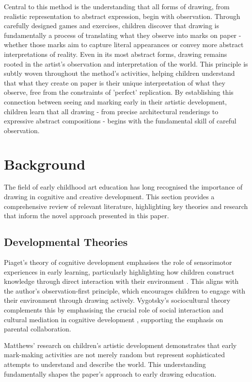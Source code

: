 \documentclass{article}
\begin{document}
Central to this method is the understanding that all forms of drawing, from realistic representation to abstract expression, begin with observation. Through carefully designed games and exercises, children discover that drawing is fundamentally a process of translating what they observe into marks on paper - whether those marks aim to capture literal appearances or convey more abstract interpretations of reality. Even in its most abstract forms, drawing remains rooted in the artist's observation and interpretation of the world. This principle is subtly woven throughout the method's activities, helping children understand that what they create on paper is their unique interpretation of what they observe, free from the constraints of 'perfect' replication. By establishing this connection between seeing and marking early in their artistic development, children learn that all drawing - from precise architectural renderings to expressive abstract compositions - begins with the fundamental skill of careful observation.

\section{Background}
\label{sec:background}

The field of early childhood art education has long recognised the importance of drawing in cognitive and creative development. This section provides a comprehensive review of relevant literature, highlighting key theories and research that inform the novel approach presented in this paper.

\subsection{Developmental Theories}

Piaget's theory of cognitive development emphasises the role of sensorimotor experiences in early learning, particularly highlighting how children construct knowledge through direct interaction with their environment \cite{piaget1969psychology}. This aligns with the author's observation-first principle, which encourages children to engage with their environment through drawing actively. Vygotsky's sociocultural theory complements this by emphasising the crucial role of social interaction and cultural mediation in cognitive development \cite{2vygotsky1978mind}, supporting the emphasis on parental collaboration.

Matthews' research on children's artistic development \cite{3matthews2003drawing} demonstrates that early mark-making activities are not merely random but represent sophisticated attempts to understand and describe the world. This understanding fundamentally shapes the paper's approach to early drawing education.
\end{document}
